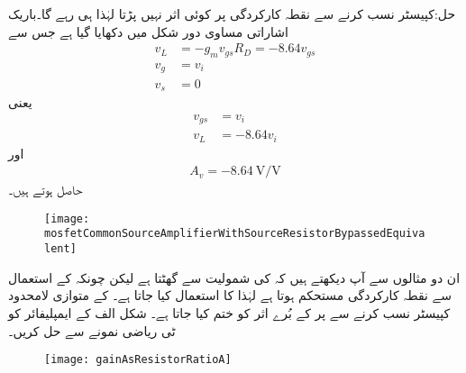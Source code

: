 حل:کپیسٹر نسب کرنے سے نقطہ کارکردگی پر کوئی اثر نہیں پڑتا لہٰذا  ہی رہے گا۔باریک اشاراتی مساوی دور شکل  میں دکھایا گیا ہے جس سے
\begin{align*}
v_L&=-g_m v_{gs} R_D=-8.64 v_{gs}\\
v_g&=v_i\\
v_s&=0
\end{align*}
یعنی
\begin{align*}
v_{gs}&=v_i\\
v_L&=-8.64 v_i
\end{align*}
اور 
\begin{align*}
A_v=\SI{-8.64}{\volt \per \volt}
\end{align*}
حاصل ہوتے ہیں۔
%
\begin{figure}
\centering
\texttt{[image: mosfetCommonSourceAmplifierWithSourceResistorBypassedEquivalent]}
\caption{}
\label{شکل_ماسفیٹ_مخارج_مزاحمت_کے_متوازی_کپیسٹر_مساوی}
\end{figure}
ان دو مثالوں سے آپ دیکھتے ہیں کہ  کی شمولیت سے  گھٹتا ہے لیکن چونکہ  کے استعمال سے نقطہ کارکردگی مستحکم ہوتا ہے لہٰذا  کا استعمال کیا جاتا ہے۔ کے متوازی لامحدود کپیسٹر نسب کرنے سے  پر  کے بُرے اثر کو ختم کیا جاتا ہے۔
شکل  الف کے ایمپلیفائر کو ٹی ریاضی نمونے سے حل کریں۔ 
\begin{figure}
\centering
\texttt{[image: gainAsResistorRatioA]}
\caption{}
\label{شکل_ماسفیٹ_افزائش_بطور_کسر_مزاحمت_الف}
\end{figure}

